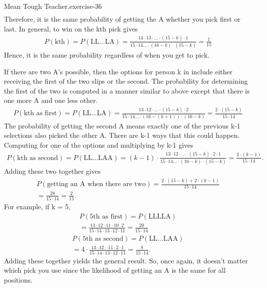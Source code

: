 \documentclass[10pt,]{book}
\numberwithin{equation}{section}
\begin{document}
\begin{inlineexercise}{Mean Tough Teacher.}{exercise-36}
\begin{gather*}
\end{gather*}
Therefore, it is the same probability of getting the A whether you pick first or last.  In general, to win on the kth pick gives%
\begin{gather*}
P(\text{kth}) = P(\text{LL...LA}) = \frac{14 \cdot 13 \cdot ... \cdot (15-k) \cdot 1}{15 \cdot 14 ... \cdot (16-k) \cdot (15-k)} = \frac{1}{15}
\end{gather*}
Hence, it is the same probability regardless of when you get to pick.%
\par
\hypertarget{p-614}{}%
If there are two A's possible, then the options for person k in include either receiving the first of the two slips or the second. The probability for determining the first of the two is computed in a manner similar to above except that there is one more A and one less other.%
\begin{gather*}
P(\text{kth as first}) = P(\text{LL...LA}) = \frac{13 \cdot 12 \cdot ... \cdot (15-k)  \cdot 2}{15 \cdot 14 ... \cdot (16-(k+1)) \cdot (16-k)} = \frac{2 \cdot (15-k)}{15 \cdot 14}
\end{gather*}
The probability of getting the second A means exactly one of the previous k-1 selections also picked the other A. There are k-1 ways that this could happen. Computing for one of the options and multiplying by k-1 gives%
\begin{gather*}
P(\text{kth as second}) = P(\text{LL...LAA}) = (k-1) \cdot \frac{13 \cdot 12 \cdot ... \cdot (15-k) \cdot 2 \cdot 1}{15 \cdot 14 ... \cdot (16-k) \cdot (15-k)} = \frac{2 \cdot (k-1)}{15 \cdot 14}.
\end{gather*}
Adding these two together gives%
\begin{gather*}
P(\text{getting an A when there are two}) = \frac{2 \cdot (15-k) + 2 \cdot (k-1)}{15 \cdot 14}\\
= \frac{28}{15 \cdot 14} = \frac{2}{15}.
\end{gather*}
For example, if k = 5,%
\begin{gather*}
P(\text{5th as first}) = P(\text{LLLLA}) \\
= \frac{13 \cdot 12 \cdot 11 \cdot 10  \cdot 2}{15 \cdot 14 \cdot 13 \cdot 12 \cdot 11} = \frac{20}{15 \cdot 14}
\end{gather*}
%
\begin{gather*}
P(\text{5th as second}) = P(\text{LL...LAA}) \\
= 4 \cdot \frac{13 \cdot 12 \cdot \cdot 11 \cdot 2 \cdot 1}{15 \cdot 14 \cdot 13 \cdot 12 \cdot 11} = \frac{8}{15 \cdot 14}.
\end{gather*}
Adding these together yields the general result. So, once again, it doesn't matter which pick you use since the likelihood of getting an A is the same for all positions.%
\end{inlineexercise}
\end{document}
